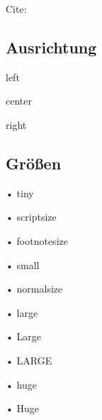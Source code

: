 \documentclass[
	12pt %
	,a4paper %
	,headings=normal %
	,toc=graduated %
]{scrreprt} %
\begin{document}
Cite: %

\subsection{Ausrichtung}\label{ssec:ausrichtung}

\begin{flushleft}
left
\end{flushleft}

\begin{center}
center
\end{center}

\begin{flushright}
right
\end{flushright}

\subsection{Grö{\ss}en}\label{ssec:groessen}

\begin{tiny}
• tiny
\end{tiny}

\begin{scriptsize}
• scriptsize
\end{scriptsize}

\begin{footnotesize}
• footnotesize
\end{footnotesize}

\begin{small}
• small
\end{small}

\begin{normalsize}
• normalsize
\end{normalsize}

\begin{large}
• large
\end{large}

\begin{Large}
• Large
\end{Large}

\begin{LARGE}
• LARGE
\end{LARGE}

\begin{huge}
• huge
\end{huge}

\begin{Huge}
• Huge
\end{Huge}
\end{document}
